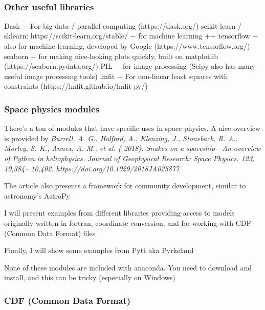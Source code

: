 \documentclass[11pt]{article}
\begin{document}
    \begin{center}
    \end{center}
    { \hspace*{\fill} \\}
    
    \hypertarget{other-useful-libraries}{%
\subsubsection{Other useful libraries}\label{other-useful-libraries}}

Dask \(-\) For big data / parallel computing (https://dask.org/)
scikit-learn / sklearn: https://scikit-learn.org/stable/ \(-\) for
machine learning ++ tensorflow \(-\) also for machine learning,
developed by Google (https://www.tensorflow.org/) seaborn \(-\) for
making nice-looking plots quickly, built on matplotlib
(https://seaborn.pydata.org/) PIL \(-\) for image processing (Scipy also
has many useful image processing tools) lmfit \(-\) For non-linear least
squares with constraints (https://lmfit.github.io/lmfit-py/)

    \hypertarget{space-physics-modules}{%
\subsubsection{Space physics modules }\label{space-physics-modules}}

There's a ton of modules that have specific uses in space physics. A
nice overview is provided by \emph{Burrell, A. G., Halford, A.,
Klenzing, J., Stoneback, R. A., Morley, S. K., Annex, A. M., et al. (
2018). Snakes on a spaceship---An overview of Python in heliophysics.
Journal of Geophysical Research: Space Physics, 123, 10,384-- 10,402.
https://doi.org/10.1029/2018JA025877}

The article also presents a framework for community development, similar
to astronomy's AstroPy

I will present examples from different libraries providing access to
models originally written in fortran, coordinate conversion, and for
working with CDF (Common Data Format) files

Finally, I will show some examples from Pytt aka Pyrkeland

None of these modules are included with anaconda. You need to download
and install, and this can be tricky (especially on Windows)

    \hypertarget{cdf-common-data-format}{%
\subsubsection{CDF (Common Data Format)}\label{cdf-common-data-format}}
\end{document}
